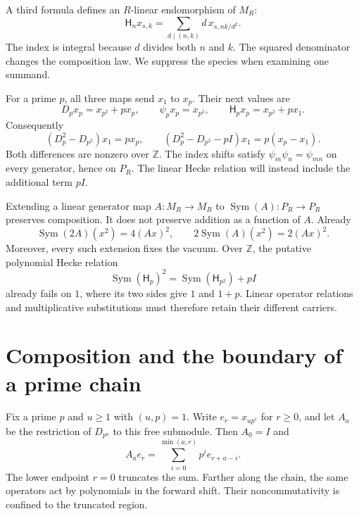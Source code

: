 A third formula defines an $R$-linear endomorphism of $M_R$:
\begin{equation}
 \label{v4-arith:hecke:eq:linear}
 \mathsf H_nx_{s,k}=\sum_{d\mid(n,k)}d\,x_{s,nk/d^2}.
\end{equation}
The index is integral because $d$ divides both $n$ and $k$.
The squared denominator changes the composition law.
We suppress the species when examining one summand.

\begin{example}
\label{v4-arith:hecke:ex:first-mode}
For a prime $p$, all three maps send $x_1$ to $x_p$.
Their next values are
\[
 D_px_p=x_{p^2}+px_p,\qquad
 \psi_px_p=x_{p^2},\qquad
 \mathsf H_px_p=x_{p^2}+px_1.
\]
Consequently
\[
 (D_p^2-D_{p^2})x_1=px_p,\qquad
 (D_p^2-D_{p^2}-pI)x_1=p(x_p-x_1).
\]
Both differences are nonzero over $\mathbb Z$.
The index shifts satisfy $\psi_m\psi_n=\psi_{mn}$ on every generator,
hence on $P_R$. The linear Hecke relation will instead include
the additional term $pI$.
\end{example}

Extending a linear generator map $A:M_R\to M_R$ to
$\operatorname{Sym}(A):P_R\to P_R$ preserves composition.
It does not preserve addition as a function of $A$.
Already
\[
 \operatorname{Sym}(2A)(x^2)=4(Ax)^2,
 \qquad 2\operatorname{Sym}(A)(x^2)=2(Ax)^2.
\]
Moreover, every such extension fixes the vacuum. Over $\mathbb Z$,
the putative polynomial Hecke relation
\[
 \operatorname{Sym}(\mathsf H_p)^2
 =\operatorname{Sym}(\mathsf H_{p^2})+pI
\]
already fails on $1$, where its two sides give $1$ and $1+p$.
Linear operator relations and multiplicative substitutions must
therefore retain their different carriers.

\section{Composition and the boundary of a prime chain}
\label{v4-arith:hecke:sec:composition}

Fix a prime $p$ and $u\geq1$ with $(u,p)=1$.
Write $e_r=x_{up^r}$ for $r\geq0$, and let $A_a$ be the
restriction of $D_{p^a}$ to this free submodule.
Then $A_0=I$ and
\begin{equation}
 \label{v4-arith:hecke:eq:prime-chain}
 A_ae_r=\sum_{i=0}^{\min(a,r)}p^i e_{r+a-i}.
\end{equation}
The lower endpoint $r=0$ truncates the sum.
Farther along the chain, the same operators act by polynomials
in the forward shift. Their noncommutativity is confined to
the truncated region.

